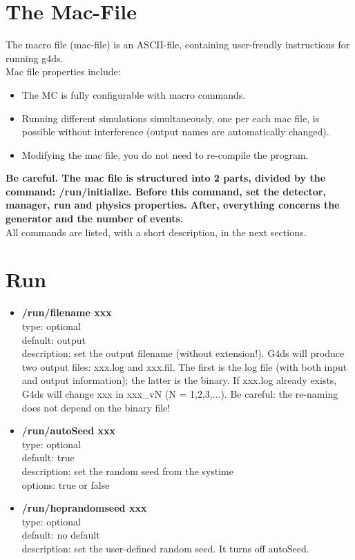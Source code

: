 \documentclass[twocolumn, 10pt]{article}
\begin{document}
\section{The Mac-File}
The macro file (mac-file) is an ASCII-file, containing user-frendly instructions for running g4ds.\\
Mac file properties include: 
\begin{itemize}
\item The MC is fully configurable with macro commands. 
\item Running different simulations simultaneously, one per each mac file, is possible without interference (output names are automatically changed).
\item Modifying the mac  file, you do not need to re-compile the program.
\end{itemize}
{\bf{Be careful.  The mac file is structured into 2 parts, divided by the command: /run/initialize. Before this command,
set the detector, manager, run and physics properties. After, everything concerns the generator and the number of events.}}\\
All commands are listed, with a short description, in the next sections.\\ 


\section{Run}

\begin{itemize}
\item \textbf{/run/filename xxx} \\
type: optional \\
default: output\\
description: set the output filename (without extension!). 
G4ds will produce two output files: xxx.log and xxx.fil.
The first is the log file (with both input and output information); the latter is the binary. 
If xxx.log already exists, G4ds will change xxx in xxx\_vN (N = 1,2,3,...). Be careful: the re-naming does not depend on the binary file!\\

\item \textbf{/run/autoSeed xxx} \\
type: optional \\
default: true\\
description: set the random seed from the systime\\
options: true or false \\

\item \textbf{/run/heprandomseed xxx}\\
type: optional \\
default: no default\\
description: set the user-defined random seed. It turns off autoSeed.\\
\end{itemize}
\end{document}
